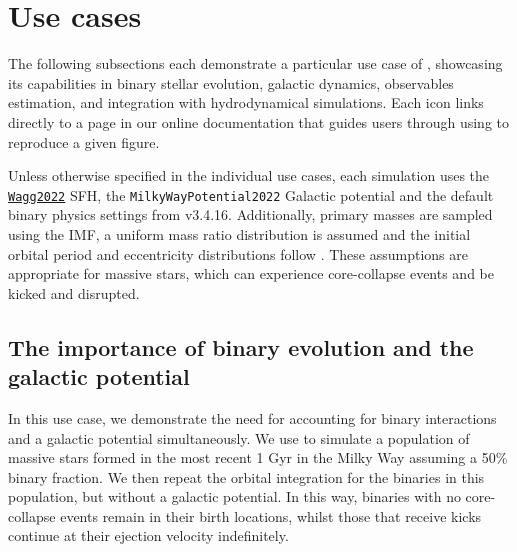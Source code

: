 \documentclass[twocolumn, twocolappendix, oneside]{aastex631}
\newcommand{\codeLink}[2]{{\href{https://cogsworth.readthedocs.io/en/latest/api/cogsworth.#2.#1.html}{\color{codecolour} \texttt{#1}}}}
\newcommand{\tutorialIcon}{{\color{codecolour}{\faLaptopCode}}}
\begin{document}
\newpage

\section{Use cases}\label{sec:use_cases}

The following subsections each demonstrate a particular use case of \cogsworth, showcasing its capabilities in binary stellar evolution, galactic dynamics, observables estimation, and integration with hydrodynamical simulations. Each \tutorialIcon{} icon links directly to a page in our online documentation that guides users through using \cogsworth to reproduce a given figure.

Unless otherwise specified in the individual use cases, each \cogsworth simulation uses the \codeLink{Wagg2022}{sfh} SFH, the \texttt{MilkyWayPotential2022} Galactic potential and the default binary physics settings from \cosmic v3.4.16. Additionally, primary masses are sampled using the \citet{Kroupa+2001:2001MNRAS.322..231K} IMF, a uniform mass ratio distribution is assumed and the initial orbital period and eccentricity distributions follow \citet{Sana+2012}. These assumptions are appropriate for massive stars, which can experience core-collapse events and be kicked and disrupted.

\subsection{The importance of binary evolution and the galactic potential}\label{sec:binaries_and_pot_use_case}

In this use case, we demonstrate the need for accounting for binary interactions and a galactic potential simultaneously. We use \cogsworth to simulate a population of massive stars formed in the most recent 1 Gyr in the Milky Way assuming a 50\% binary fraction. We then repeat the orbital integration for the binaries in this population, but without a galactic potential. In this way, binaries with no core-collapse events remain in their birth locations, whilst those that receive kicks continue at their ejection velocity indefinitely.
\end{document}
